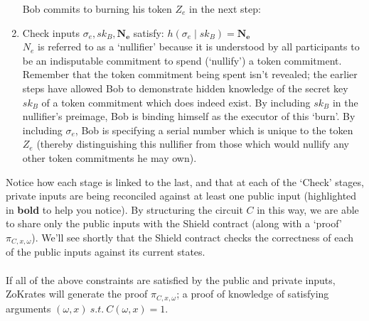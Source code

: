 \documentclass{article}
\begin{document}
\begin{enumerate}
  Bob commits to burning his token $Z_e$ in the next step:
  \item Check inputs $\sigma_e, sk_B, \bm{N_e}$ satisfy:
    $h(\sigma_e\;|\;sk_B) = \bm{N_e}$\\
    $N_e$ is referred to as a `nullifier' because it is understood by all participants to be an indisputable commitment to spend (`nullify') a token commitment. Remember that the token commitment being spent isn't revealed; the earlier steps have allowed Bob to demonstrate hidden knowledge of the secret key $sk_B$ of a token commitment which does indeed exist. By including $sk_B$ in the nullifier's preimage, Bob is binding himself as the executor of this `burn'. By including $\sigma_e$, Bob is specifying a serial number which is unique to the token $Z_e$ (thereby distinguishing this nullifier from those which would nullify any other token commitments he may own).
\end{enumerate}
Notice how each stage is linked to the last, and that at each of the `Check' stages, private inputs are being reconciled against at least one public input (highlighted in \textbf{bold} to help you notice). By structuring the circuit $C$ in this way, we are able to share only the public inputs with the Shield contract (along with a `proof' $\pi_{C,x,\omega}$). We'll see shortly that the Shield contract checks the correctness of each of the public inputs against its current states.\\
\\

\noindent
If all of the above constraints are satisfied by the public and private inputs, ZoKrates will generate the proof $\pi_{C,x,\omega}$; a proof of knowledge of satisfying arguments $(\omega, x) \ s.t. \ C(\omega, x) = 1$.
\end{document}
